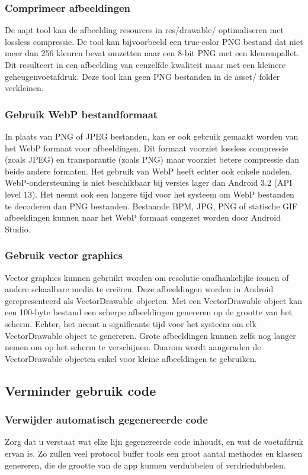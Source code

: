 \subsubsection{Comprimeer afbeeldingen }
\label{sec:compressimages}
De aapt tool kan de afbeelding resources in res/drawable/ optimaliseren met lossless compressie. De tool kan bijvoorbeeld een true-color PNG bestand dat niet meer dan 256 kleuren bevat omzetten naar een 8-bit PNG met een kleurenpallet. Dit resulteert in een afbeelding van eenzelfde kwaliteit maar met een kleinere geheugenvoetafdruk. Deze tool kan geen PNG bestanden in de asset/ folder verkleinen. 
\subsubsection{Gebruik WebP bestandformaat }
\label{sec:webp}
In plaats van PNG of JPEG bestanden, kan er ook gebruik gemaakt worden van het WebP formaat voor afbeeldingen. Dit formaat voorziet lossless compressie (zoals JPEG) en transparantie (zoals PNG) maar voorziet betere compressie dan beide andere formaten. Het gebruik van WebP heeft echter ook enkele nadelen. WebP-ondersteuning is niet beschikbaar bij versies lager dan Android 3.2 (API level 13). Het neemt ook een langere tijd voor het systeem om WebP bestanden te decoderen dan PNG bestanden. Bestaande BPM, JPG, PNG of statische GIF afbeeldingen kunnen naar het WebP formaat omgezet worden door Android Studio. 

\subsubsection{Gebruik vector graphics }
\label{sec:vectorgraphics}
Vector graphics kunnen gebruikt worden om resolutie-onafhankelijke iconen of andere schaalbare media te creëren. Deze afbeeldingen worden in Android gerepresenteerd als VectorDrawable objecten. Met een VectorDrawable object kan een 100-byte bestand een scherpe afbeeldingen genereren op de grootte van het scherm. 
Echter, het neemt a significante tijd voor het systeem om elk VectorDrawable object te genereren. Grote afbeeldingen kunnen zelfs nog langer nemen om op het scherm te verschijnen. Daarom wordt aangeraden de VectorDrawable objecten enkel voor kleine afbeeldingen te gebruiken. 
\subsection{Verminder gebruik code}
\label{sec:reducecode}

\subsubsection{Verwijder automatisch gegenereerde code}
\label{sec:reducegeneratedcode}
Zorg dat u verstaat wat elke lijn gegenereerde code inhoudt, en wat de voetafdruk ervan is. Zo zullen veel protocol buffer tools een groot aantal methodes en klassen genereren, die de grootte van de app kunnen verdubbelen of verdriedubbelen.

